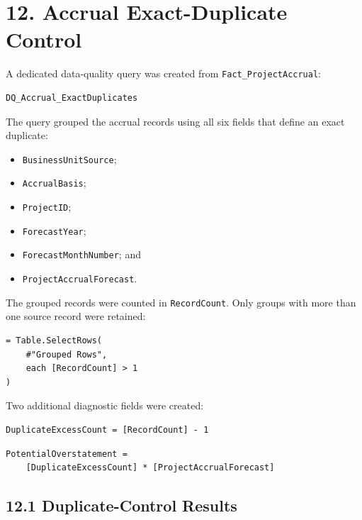 \documentclass[11pt,a4paper]{article}
\begin{document}

\section{12. Accrual Exact-Duplicate Control}

A dedicated data-quality query was created from
\texttt{Fact\_ProjectAccrual}:

\begin{lstlisting}[style=powerquery]
DQ_Accrual_ExactDuplicates
\end{lstlisting}

The query grouped the accrual records using all six fields that define an
exact duplicate:

\begin{itemize}[leftmargin=7mm,itemsep=2pt]
    \item \texttt{BusinessUnitSource};
    \item \texttt{AccrualBasis};
    \item \texttt{ProjectID};
    \item \texttt{ForecastYear};
    \item \texttt{ForecastMonthNumber}; and
    \item \texttt{ProjectAccrualForecast}.
\end{itemize}

The grouped records were counted in \texttt{RecordCount}. Only groups
with more than one source record were retained:

\begin{lstlisting}[style=powerquery]
= Table.SelectRows(
    #"Grouped Rows",
    each [RecordCount] > 1
)
\end{lstlisting}

Two additional diagnostic fields were created:

\begin{lstlisting}[style=powerquery]
DuplicateExcessCount = [RecordCount] - 1
\end{lstlisting}

\begin{lstlisting}[style=powerquery]
PotentialOverstatement =
    [DuplicateExcessCount] * [ProjectAccrualForecast]
\end{lstlisting}

\clearpage

\subsection{12.1 Duplicate-Control Results}
\end{document}

